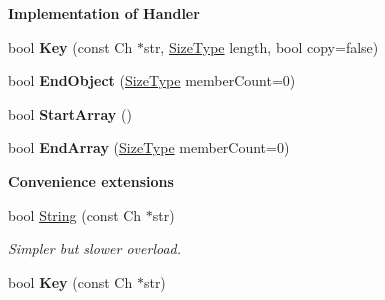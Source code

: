 \begin{Indent}{\bf Implementation of Handler}
\begin{DoxyCompactItemize}
\item 
bool {\bfseries Key} (const Ch $\ast$str, \hyperlink{rapidjson_8h_a5ed6e6e67250fadbd041127e6386dcb5}{Size\+Type} length, bool copy=false)\hypertarget{class_pretty_writer_a26932858cdca972598f7caa6f415f310}{}\label{class_pretty_writer_a26932858cdca972598f7caa6f415f310}

\item 
bool {\bfseries End\+Object} (\hyperlink{rapidjson_8h_a5ed6e6e67250fadbd041127e6386dcb5}{Size\+Type} member\+Count=0)\hypertarget{class_pretty_writer_a5837a63cac4735eaeedbaff287e1ab9e}{}\label{class_pretty_writer_a5837a63cac4735eaeedbaff287e1ab9e}

\item 
bool {\bfseries Start\+Array} ()\hypertarget{class_pretty_writer_a12dd02678ab52b9061bb6ac01cca2601}{}\label{class_pretty_writer_a12dd02678ab52b9061bb6ac01cca2601}

\item 
bool {\bfseries End\+Array} (\hyperlink{rapidjson_8h_a5ed6e6e67250fadbd041127e6386dcb5}{Size\+Type} member\+Count=0)\hypertarget{class_pretty_writer_a5196275e826a37a163d178da612f58f9}{}\label{class_pretty_writer_a5196275e826a37a163d178da612f58f9}

\end{DoxyCompactItemize}
\end{Indent}
\begin{Indent}{\bf Convenience extensions}\par
\begin{DoxyCompactItemize}
\item 
bool \hyperlink{class_pretty_writer_ac6ef0185174838b7034b4183013ee073}{String} (const Ch $\ast$str)\hypertarget{class_pretty_writer_ac6ef0185174838b7034b4183013ee073}{}\label{class_pretty_writer_ac6ef0185174838b7034b4183013ee073}

\begin{DoxyCompactList}\small\item\em Simpler but slower overload. \end{DoxyCompactList}\item 
bool {\bfseries Key} (const Ch $\ast$str)\hypertarget{class_pretty_writer_a0a4859ad940668cf33d18b144e5e1cdd}{}\label{class_pretty_writer_a0a4859ad940668cf33d18b144e5e1cdd}

\end{DoxyCompactItemize}
\end{Indent}
